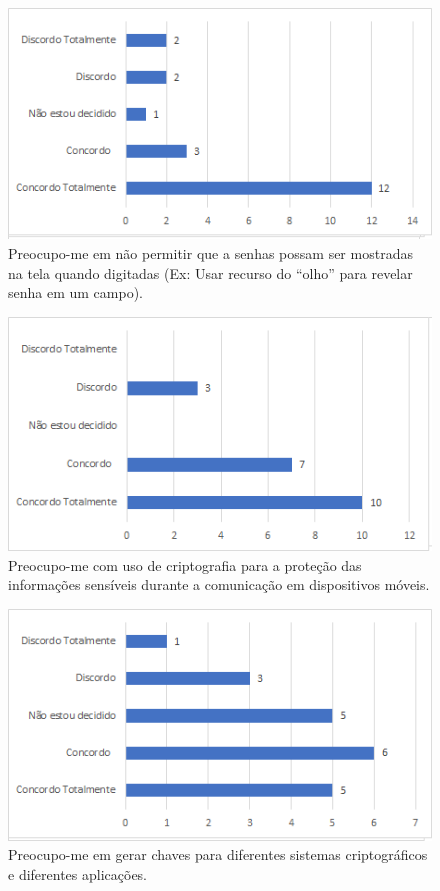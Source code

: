 \begin{figure}[!t]
\centering
\includegraphics[scale=0.7]{figuras das questoes/2.13.png}
\caption{Preocupo-me em não permitir que a senhas possam ser mostradas na tela quando digitadas (Ex: Usar recurso do “olho” para revelar senha em um campo).}
\end{figure}

\begin{figure}[!t]
\centering
\includegraphics[scale=0.7]{figuras das questoes/3.1.png}
\caption{Preocupo-me com uso de criptografia para a proteção das informações sensíveis durante a comunicação em dispositivos móveis.}
\end{figure}

\begin{figure}[!t]
\centering
\includegraphics[scale=0.7]{figuras das questoes/3.2.png}
\caption{Preocupo-me em gerar chaves para diferentes sistemas criptográficos e diferentes aplicações.}
\end{figure}

